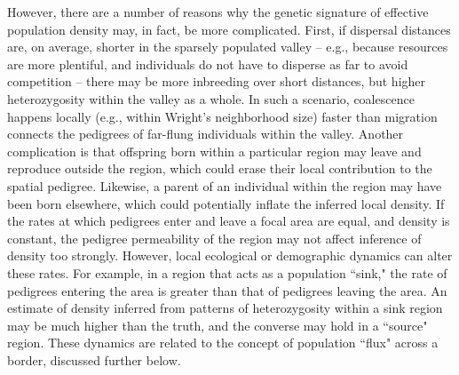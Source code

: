 \documentclass{ar-1col}
\begin{document}
However, there are a number of reasons why the genetic signature 
of effective population density may, in fact, be more complicated.
First, if dispersal distances are, on average, shorter 
in the sparsely populated valley -- 
e.g., because resources are more plentiful, 
and individuals do not have to disperse as far to avoid competition -- 
there may be more inbreeding over short distances, 
but higher heterozygosity within the valley as a whole.
In such a scenario, coalescence happens locally 
(e.g., within Wright's neighborhood size)
faster than migration connects the pedigrees of 
far-flung individuals within the valley.
Another complication is that offspring born within a particular region 
may leave and reproduce outside the region, 
which could erase their local contribution to the spatial pedigree.
Likewise, a parent of an individual within the region 
may have been born elsewhere, 
which could potentially inflate the inferred local density.
If the rates at which pedigrees enter and leave a focal area are equal, 
and density is constant, 
the pedigree permeability of the region may not affect inference of density too strongly.
However, local ecological or demographic dynamics 
can alter these rates.
For example, in a region that acts as a population ``sink,"
the rate of pedigrees entering the area is greater than 
that of pedigrees leaving the area.
An estimate of density inferred from patterns of heterozygosity 
within a sink region may be much higher than the truth, 
and the converse may hold in a ``source" region.
These dynamics are related to the concept of population ``flux" 
across a border, discussed further below.
\end{document}
